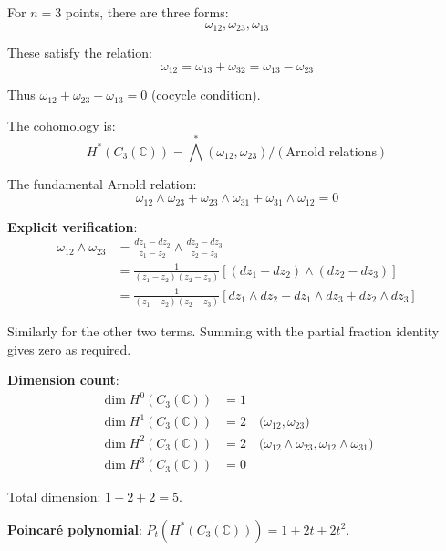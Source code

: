 \begin{example}[$n=3$: The Fundamental Relation]
\label{ex:arnold-n3-complete}

For $n=3$ points, there are three forms:
\begin{equation}
\omega_{12}, \omega_{23}, \omega_{13}
\end{equation}

These satisfy the relation:
\begin{equation}
\omega_{12} = \omega_{13} + \omega_{32} = \omega_{13} - \omega_{23}
\end{equation}

Thus $\omega_{12} + \omega_{23} - \omega_{13} = 0$ (cocycle condition).

The cohomology is:
\begin{equation}
H^*(C_3(\mathbb{C})) = \bigwedge^*(\omega_{12}, \omega_{23}) / (\text{Arnold relations})
\end{equation}

The fundamental Arnold relation:
\begin{equation}
\boxed{\omega_{12} \wedge \omega_{23} + \omega_{23} \wedge \omega_{31} + \omega_{31} 
\wedge \omega_{12} = 0}
\end{equation}

\textbf{Explicit verification}:
\begin{align}
\omega_{12} \wedge \omega_{23} &= \frac{dz_1 - dz_2}{z_1 - z_2} \wedge \frac{dz_2 - 
dz_3}{z_2 - z_3}\\
&= \frac{1}{(z_1-z_2)(z_2-z_3)} [(dz_1 - dz_2) \wedge (dz_2 - dz_3)]\\
&= \frac{1}{(z_1-z_2)(z_2-z_3)} [dz_1 \wedge dz_2 - dz_1 \wedge dz_3 + dz_2 \wedge dz_3]
\end{align}

Similarly for the other two terms. Summing with the partial fraction identity gives zero 
as required.

\textbf{Dimension count}:
\begin{align}
\dim H^0(C_3(\mathbb{C})) &= 1\\
\dim H^1(C_3(\mathbb{C})) &= 2 \quad \text{(}\omega_{12}, \omega_{23}\text{)}\\
\dim H^2(C_3(\mathbb{C})) &= 2 \quad \text{(}\omega_{12} \wedge \omega_{23}, 
\omega_{12} \wedge \omega_{31}\text{)}\\
\dim H^3(C_3(\mathbb{C})) &= 0
\end{align}

Total dimension: $1 + 2 + 2 = 5$.

\textbf{Poincaré polynomial}: $P_t(H^*(C_3(\mathbb{C}))) = 1 + 2t + 2t^2$.
\end{example}

